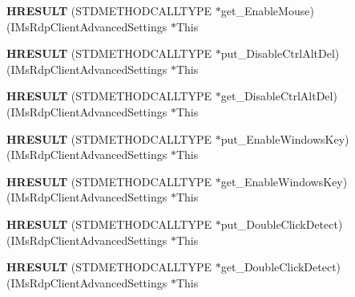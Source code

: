 \begin{DoxyCompactItemize}
{\bfseries H\+R\+E\+S\+U\+LT} (S\+T\+D\+M\+E\+T\+H\+O\+D\+C\+A\+L\+L\+T\+Y\+PE $\ast$get\+\_\+\+Enable\+Mouse)(I\+Ms\+Rdp\+Client\+Advanced\+Settings $\ast$This
\item 
\mbox{\label{struct_i_ms_rdp_client_advanced_settings_vtbl_a5d26d1b3454a6184a7de977632362e30}} 
{\bfseries H\+R\+E\+S\+U\+LT} (S\+T\+D\+M\+E\+T\+H\+O\+D\+C\+A\+L\+L\+T\+Y\+PE $\ast$put\+\_\+\+Disable\+Ctrl\+Alt\+Del)(I\+Ms\+Rdp\+Client\+Advanced\+Settings $\ast$This
\item 
\mbox{\label{struct_i_ms_rdp_client_advanced_settings_vtbl_a64354dc4e0d521065bbd520212e9a1f5}} 
{\bfseries H\+R\+E\+S\+U\+LT} (S\+T\+D\+M\+E\+T\+H\+O\+D\+C\+A\+L\+L\+T\+Y\+PE $\ast$get\+\_\+\+Disable\+Ctrl\+Alt\+Del)(I\+Ms\+Rdp\+Client\+Advanced\+Settings $\ast$This
\item 
\mbox{\label{struct_i_ms_rdp_client_advanced_settings_vtbl_a9c48f859f28419cdeb8ad22291a2bdf0}} 
{\bfseries H\+R\+E\+S\+U\+LT} (S\+T\+D\+M\+E\+T\+H\+O\+D\+C\+A\+L\+L\+T\+Y\+PE $\ast$put\+\_\+\+Enable\+Windows\+Key)(I\+Ms\+Rdp\+Client\+Advanced\+Settings $\ast$This
\item 
\mbox{\label{struct_i_ms_rdp_client_advanced_settings_vtbl_a3e0818a29157538d6c681d3c34da84f5}} 
{\bfseries H\+R\+E\+S\+U\+LT} (S\+T\+D\+M\+E\+T\+H\+O\+D\+C\+A\+L\+L\+T\+Y\+PE $\ast$get\+\_\+\+Enable\+Windows\+Key)(I\+Ms\+Rdp\+Client\+Advanced\+Settings $\ast$This
\item 
\mbox{\label{struct_i_ms_rdp_client_advanced_settings_vtbl_a2de24ec4273f6aa128296f1842602032}} 
{\bfseries H\+R\+E\+S\+U\+LT} (S\+T\+D\+M\+E\+T\+H\+O\+D\+C\+A\+L\+L\+T\+Y\+PE $\ast$put\+\_\+\+Double\+Click\+Detect)(I\+Ms\+Rdp\+Client\+Advanced\+Settings $\ast$This
\item 
\mbox{\label{struct_i_ms_rdp_client_advanced_settings_vtbl_a35edceeb504c2b862352176742557094}} 
{\bfseries H\+R\+E\+S\+U\+LT} (S\+T\+D\+M\+E\+T\+H\+O\+D\+C\+A\+L\+L\+T\+Y\+PE $\ast$get\+\_\+\+Double\+Click\+Detect)(I\+Ms\+Rdp\+Client\+Advanced\+Settings $\ast$This
\item 

\end{DoxyCompactItemize}
